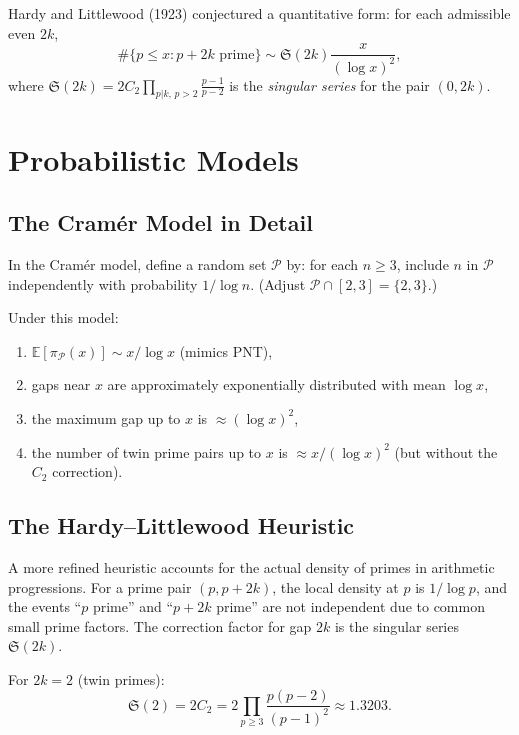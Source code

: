 \documentclass[12pt,a4paper]{amsart}
\theoremstyle{definition}
\begin{document}
Hardy and Littlewood (1923) conjectured a quantitative form: for each admissible
even $2k$,
\[
  \#\{p \leq x : p + 2k \text{ prime}\} \sim \mathfrak{S}(2k) \frac{x}{(\log x)^2},
\]
where $\mathfrak{S}(2k) = 2C_2 \prod_{p | k,\, p > 2} \frac{p-1}{p-2}$ is the
\emph{singular series} for the pair $(0, 2k)$.

\section{Probabilistic Models}

\subsection{The Cram\'{e}r Model in Detail}

In the Cram\'{e}r model, define a random set $\mathcal{P}$ by: for each $n \geq
3$, include $n$ in $\mathcal{P}$ independently with probability $1/\log n$.
(Adjust $\mathcal{P} \cap [2,3] = \{2,3\}$.)

Under this model:
\begin{enumerate}[label=(\roman*)]
  \item $\mathbb{E}[\pi_{\mathcal{P}}(x)] \sim x/\log x$ (mimics PNT),
  \item gaps near $x$ are approximately exponentially distributed with mean
        $\log x$,
  \item the maximum gap up to $x$ is $\approx (\log x)^2$,
  \item the number of twin prime pairs up to $x$ is
        $\approx x/(\log x)^2$ (but without the $C_2$ correction).
\end{enumerate}

\subsection{The Hardy--Littlewood Heuristic}

A more refined heuristic accounts for the actual density of primes in arithmetic
progressions. For a prime pair $(p, p+2k)$, the local density at $p$ is
$1/\log p$, and the events ``$p$ prime'' and ``$p+2k$ prime'' are not
independent due to common small prime factors. The correction factor for gap $2k$
is the singular series $\mathfrak{S}(2k)$.

For $2k = 2$ (twin primes):
\[
  \mathfrak{S}(2) = 2 C_2 = 2 \prod_{p \geq 3} \frac{p(p-2)}{(p-1)^2} \approx 1.3203.
\]
\end{document}
